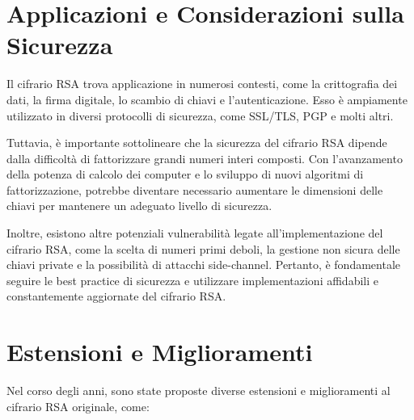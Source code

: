 \documentclass[a4paper,12pt]{report}
\begin{document}
\section{Applicazioni e Considerazioni sulla Sicurezza}
Il cifrario RSA trova applicazione in numerosi contesti, come la crittografia dei dati, la firma digitale, lo scambio di chiavi e l'autenticazione. Esso è ampiamente utilizzato in diversi protocolli di sicurezza, come SSL/TLS, PGP e molti altri.

Tuttavia, è importante sottolineare che la sicurezza del cifrario RSA dipende dalla difficoltà di fattorizzare grandi numeri interi composti. Con l'avanzamento della potenza di calcolo dei computer e lo sviluppo di nuovi algoritmi di fattorizzazione, potrebbe diventare necessario aumentare le dimensioni delle chiavi per mantenere un adeguato livello di sicurezza.

Inoltre, esistono altre potenziali vulnerabilità legate all'implementazione del cifrario RSA, come la scelta di numeri primi deboli, la gestione non sicura delle chiavi private e la possibilità di attacchi side-channel. Pertanto, è fondamentale seguire le best practice di sicurezza e utilizzare implementazioni affidabili e constantemente aggiornate del cifrario RSA.

\section{Estensioni e Miglioramenti}
Nel corso degli anni, sono state proposte diverse estensioni e miglioramenti al cifrario RSA originale, come:
\end{document}
